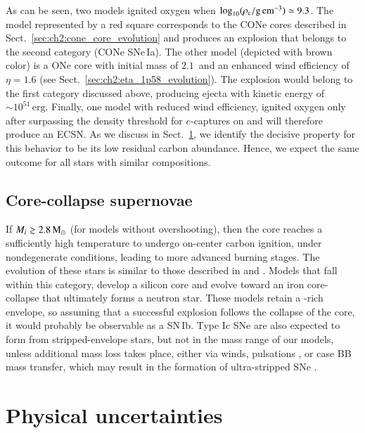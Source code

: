 \documentclass[main.tex]{subfiles}
\begin{document}
As can be seen, two models ignited oxygen when $\log_{10} (\rho_{\mathrm{c}}/ \mathrm{g\,cm^{-3}})\simeq 9.3$. The model represented by a red square corresponds to the CONe cores described in Sect.~\ref{sec:ch2:cone_core_evolution} and produces an explosion that belongs to the second category (CONe SNe\,Ia). The other model (depicted with brown color) is a \seriestwo ONe core with initial mass of $2.1$\msun\ and an enhanced wind efficiency of $\eta = 1.6$ (see Sect.~\ref{sec:ch2:eta_1p58_evolution}). The explosion would belong to the first category discussed above, producing ejecta with kinetic energy of $\sim  10^{51}\, \text{erg}$. 
Finally, one \seriestwo model with reduced wind efficiency, ignited oxygen only after surpassing the density threshold for 
$e$-captures on  and will therefore produce an ECSN. As we discuss in Sect.~\ref{sec:ch2:physical_uncertainties}, we identify the decisive property for this behavior to be its low residual carbon abundance. Hence, we expect the same outcome  for all stars with  similar compositions. 

\newpage
\subsection{Core-collapse supernovae}\label{sec:ch2:ccsn_evolution}
If $ M_i  \gtrsim 2.8\mathrm{\,M_\odot}$ (for models without overshooting), then the core reaches a 
sufficiently high temperature to undergo on-center carbon ignition, under nondegenerate conditions, leading to more advanced burning stages. The evolution of these stars is similar to those described in \cite{Jones2013apj} and \cite{Woosley:2019sdf}.
Models that fall within this category, develop a silicon core and evolve toward an iron core-collapse that  ultimately forms a neutron 
star. These models retain a -rich envelope, so assuming that a successful explosion follows the collapse of the core, it would 
probably be observable  as a SN\,Ib. Type Ic SNe are also expected to 
form from stripped-envelope stars, but not in the mass range of our 
models, unless additional mass loss takes place, either via winds,  
pulsations \citep{Aguilera-Dena:2021abc}, or case BB mass transfer, 
which may result in the formation of ultra-stripped SNe  \citep{Tauris:2015xra}. 



\section{Physical uncertainties} \label{sec:ch2:physical_uncertainties}
\end{document}
